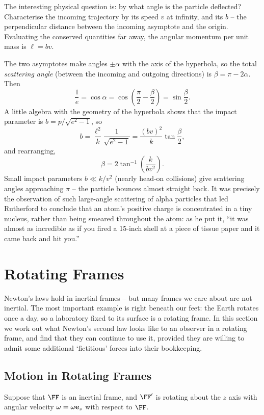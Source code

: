 \documentclass[a4paper]{scrartcl}
\begin{document}
The interesting physical question is: by what angle is the particle deflected? Characterise the incoming trajectory by its speed $v$ at infinity, and its  $b$ -- the perpendicular distance between the incoming asymptote and the origin. Evaluating the conserved quantities far away, the angular momentum per unit mass is $\ell = bv$.

The two asymptotes make angles $\pm \alpha$ with the axis of the hyperbola, so the total \emph{scattering angle} (between the incoming and outgoing directions) is $\beta = \pi - 2\alpha$. Then
$$
\frac{1}{e} = \cos \alpha = \cos\left(\frac{\pi}{2} - \frac{\beta}{2}\right) = \sin \frac{\beta}{2}.
$$
A little algebra with the geometry of the hyperbola shows that the impact parameter is $b = p/\sqrt{e^2 - 1}$, so
$$
b = \frac{\ell^2}{k}\frac{1}{\sqrt{e^2 - 1}} = \frac{(bv)^2}{k} \tan \frac{\beta}{2},
$$
and rearranging,
$$
\beta = 2 \tan^{-1}\left(\frac{k}{b v^2}\right).
$$
Small impact parameters $b \ll k/v^2$ (nearly head-on collisions) give scattering angles approaching $\pi$ -- the particle bounces almost straight back. It was precisely the observation of such large-angle scattering of alpha particles that led Rutherford to conclude that an atom's positive charge is concentrated in a tiny nucleus, rather than being smeared throughout the atom: as he put it, ``it was almost as incredible as if you fired a 15-inch shell at a piece of tissue paper and it came back and hit you.''
\section{Rotating Frames} \label{sec:rotating}

Newton's laws hold in inertial frames -- but many frames we care about are not inertial. The most important example is right beneath our feet: the Earth rotates once a day, so a laboratory fixed to its surface is a rotating frame. In this section we work out what Newton's second law looks like to an observer in a rotating frame, and find that they can continue to use it, provided they are willing to admit some additional `fictitious' forces into their bookkeeping.

\subsection{Motion in Rotating Frames}

Suppose that $\FF$ is an inertial frame, and $\FF'$ is rotating about the $z$ axis with angular velocity $\mathbf{\omega} = \omega \mathbf{e}_z$ with respect to $\FF$.
\end{document}
